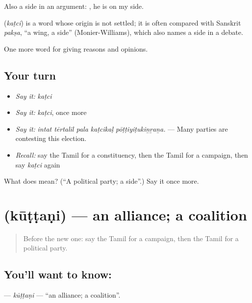 Also a side in an argument:   , he is on my side.

\begin{cousinweb}
\textbf{} (\emph{kaṭci}) is a word whose origin is not settled; it is often compared with Sanskrit \emph{pakṣa}, \textquotedblleft{}a wing, a side\textquotedblright{} (Monier-Williams), which also names a side in a debate.
\end{cousinweb}

\begin{grammarlens}[title={What you've built}]
One more word for giving reasons and opinions.
\end{grammarlens}

\subsection*{Your turn}
\begin{itemize}
\raggedright
  \item \emph{Say it:} \emph{kaṭci}
  \item \emph{Say it:} \emph{kaṭci}, once more
  \item \emph{Say it:} \emph{intat tērtalil pala kaṭcikaḷ pōṭṭiyiṭukiṉṟaṉa.} — Many parties are contesting this election.
  \item \emph{Recall:} say the Tamil for a constituency, then the Tamil for a campaign, then say \emph{kaṭci} again
\end{itemize}

\begin{tcolorbox}[breakable,colback=teal!4,colframe=teal!35!black,title={Before you move on}]
What does  mean? (\textquotedblleft{}A political party; a side\textquotedblright{}.) Say it once more.
\end{tcolorbox}
\section[\texorpdfstring{\ta{கூட்டணி} (kūṭṭaṇi)}{கூட்டணி (kūṭṭaṇi)}]{ (kūṭṭaṇi) — an alliance; a coalition}

\label{lesson:TA-C375-kuttani}



\begin{quote}
Before the new one: say the Tamil for a campaign, then the Tamil for a political party.
\end{quote}

\subsection*{You'll want to know: }
\textbf{} — \emph{kūṭṭaṇi} — \textquotedblleft{}an alliance; a coalition\textquotedblright{}.

